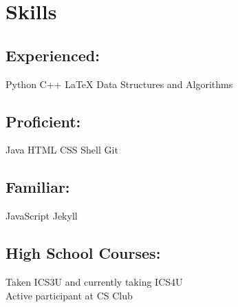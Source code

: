 \section{Skills}
\subsection{Experienced:}
Python \textbullet{} C++ \textbullet{} \LaTeX \textbullet{} Data Structures and Algorithms \\
\sectionsep

\sectionsep
\subsection{Proficient:}
Java \textbullet{} HTML \textbullet{} CSS \textbullet{} Shell \textbullet{} Git \\
\sectionsep

\subsection{Familiar:}
JavaScript \textbullet{} Jekyll \\
\sectionsep
\subsection{High School Courses:}
Taken ICS3U and currently taking ICS4U \\ 
Active participant at CS Club
\sectionsep